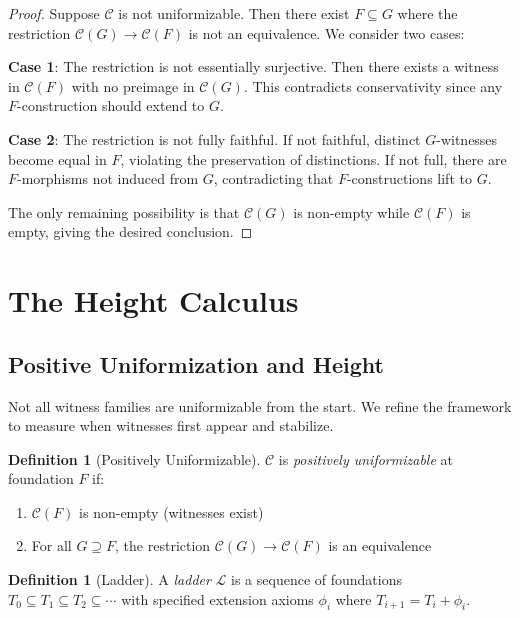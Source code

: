 \documentclass[11pt]{article}
\theoremstyle{plain}
\theoremstyle{definition}
\newtheorem{definition}[theorem]{Definition}
\begin{document}
\begin{proof}
Suppose $\mathcal{C}$ is not uniformizable. Then there exist $F \subseteq G$ where the restriction $\mathcal{C}(G) \to \mathcal{C}(F)$ is not an equivalence. We consider two cases:

\textbf{Case 1}: The restriction is not essentially surjective. Then there exists a witness in $\mathcal{C}(F)$ with no preimage in $\mathcal{C}(G)$. This contradicts conservativity since any $F$-construction should extend to $G$.

\textbf{Case 2}: The restriction is not fully faithful. If not faithful, distinct $G$-witnesses become equal in $F$, violating the preservation of distinctions. If not full, there are $F$-morphisms not induced from $G$, contradicting that $F$-constructions lift to $G$.

The only remaining possibility is that $\mathcal{C}(G)$ is non-empty while $\mathcal{C}(F)$ is empty, giving the desired conclusion.
\end{proof}

\section{The Height Calculus}

\subsection{Positive Uniformization and Height}

Not all witness families are uniformizable from the start. We refine the framework to measure when witnesses first appear and stabilize.

\begin{definition}[Positively Uniformizable]\label{def:pos-unif}
$\mathcal{C}$ is \emph{positively uniformizable} at foundation $F$ if:
\begin{enumerate}
\item $\mathcal{C}(F)$ is non-empty (witnesses exist)
\item For all $G \supseteq F$, the restriction $\mathcal{C}(G) \to \mathcal{C}(F)$ is an equivalence
\end{enumerate}
\end{definition}

\begin{definition}[Ladder]\label{def:ladder}
A \emph{ladder} $\mathcal{L}$ is a sequence of foundations $T_0 \subseteq T_1 \subseteq T_2 \subseteq \cdots$ with specified extension axioms $\phi_i$ where $T_{i+1} = T_i + \phi_i$.
\end{definition}
\end{document}
